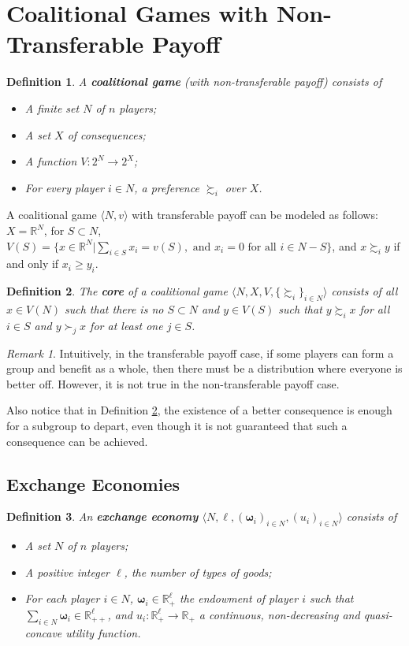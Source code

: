 \documentclass[openany]{book}
\newtheorem{definition}{Definition}[chapter]
\theoremstyle{remark}
\newtheorem*{remark}{Remark}
\begin{document}
\section{Coalitional Games with Non-Transferable Payoff}
\begin{definition}
    A \textbf{coalitional game} (with non-transferable payoff) consists of
    \begin{itemize}
        \item A finite set $N$ of $n$ players;
        \item A set $X$ of consequences;
        \item A function $V:2^N\to 2^X$;
        \item For every player $i\in N$, a preference $\succsim_i$ over $X$.
    \end{itemize}
\end{definition}
A coalitional game $\langle N,v\rangle$ with transferable payoff can be modeled as follows: $X=\mathbb{R}^N$, for $S\subset N$, $V(S)=\{x\in \mathbb{R}^N|\sum_{i\in S}^{}x_i=v(S),\textrm{ and }x_i=0\textrm{ for all }i\in N-S\}$, and $x\succsim_iy$ if and only if $x_i\ge y_i$.
\begin{definition}\label{coreNTU}
    The \textbf{core} of a coalitional game $\langle N,X,V,\{\succsim_i\}_{i\in N}\rangle$ consists of all $x\in V(N)$ such that there is no $S\subset N$ and $y\in V(S)$ such that $y\succsim_ix$ for all $i\in S$ and $y\succ_jx$ for at least one $j\in S$.
\end{definition}
\begin{remark}
    Intuitively, in the transferable payoff case, if some players can form a group and benefit as a whole, then there must be a distribution where everyone is better off. However, it is not true in the non-transferable payoff case.

    Also notice that in Definition \ref{coreNTU}, the existence of a better consequence is enough for a subgroup to depart, even though it is not guaranteed that such a consequence can be achieved.
\end{remark}

\subsection{Exchange Economies}\label{exchEcon}
\begin{definition}
    An \textbf{exchange economy} $\langle N,\ell,(\boldsymbol{\omega}_i)_{i\in N},(u_i)_{i\in N}\rangle$ consists of
    \begin{itemize}
        \item A set $N$ of $n$ players;
        \item A positive integer $\ell$, the number of types of goods;
        \item For each player $i\in N$, $\boldsymbol{\omega}_i\in \mathbb{R}_+^{\ell}$ the endowment of player $i$ such that $\sum_{i\in N}^{}\boldsymbol{\omega}_i\in \mathbb{R}_{++}^{\ell}$, and $u_i:\mathbb{R}_+^{\ell}\to \mathbb{R}_+$ a continuous, non-decreasing and quasi-concave utility function.
    \end{itemize}
\end{definition}
\end{document}
